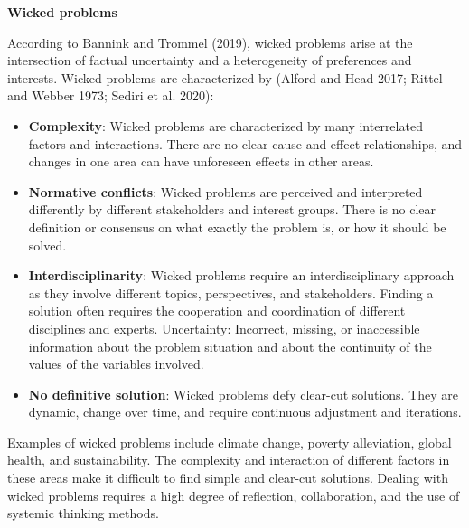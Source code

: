\documentclass[
  a4paper,
  openany]{book}
\begin{document}
\begin{tcolorbox}[enhanced jigsaw, breakable, rightrule=.15mm, arc=.35mm, bottomrule=.15mm, opacityback=0, leftrule=.75mm, toprule=.15mm, left=2mm, colback=white, colframe=quarto-callout-note-color-frame]

\vspace{-3mm}\textbf{Wicked problems}\vspace{3mm}

According to Bannink and Trommel (2019), wicked problems arise at the
intersection of factual uncertainty and a heterogeneity of preferences
and interests. Wicked problems are characterized by (Alford and Head
2017; Rittel and Webber 1973; Sediri et al. 2020):

\begin{itemize}
\item
  \textbf{Complexity}: Wicked problems are characterized by many
  interrelated factors and interactions. There are no clear
  cause-and-effect relationships, and changes in one area can have
  unforeseen effects in other areas.
\item
  \textbf{Normative conflicts}: Wicked problems are perceived and
  interpreted differently by different stakeholders and interest groups.
  There is no clear definition or consensus on what exactly the problem
  is, or how it should be solved.
\item
  \textbf{Interdisciplinarity}: Wicked problems require an
  interdisciplinary approach as they involve different topics,
  perspectives, and stakeholders. Finding a solution often requires the
  cooperation and coordination of different disciplines and experts.
  Uncertainty: Incorrect, missing, or inaccessible information about the
  problem situation and about the continuity of the values of the
  variables involved.
\item
  \textbf{No definitive solution}: Wicked problems defy clear-cut
  solutions. They are dynamic, change over time, and require continuous
  adjustment and iterations.
\end{itemize}

Examples of wicked problems include climate change, poverty alleviation,
global health, and sustainability. The complexity and interaction of
different factors in these areas make it difficult to find simple and
clear-cut solutions. Dealing with wicked problems requires a high degree
of reflection, collaboration, and the use of systemic thinking methods.

\end{tcolorbox}
\end{document}
